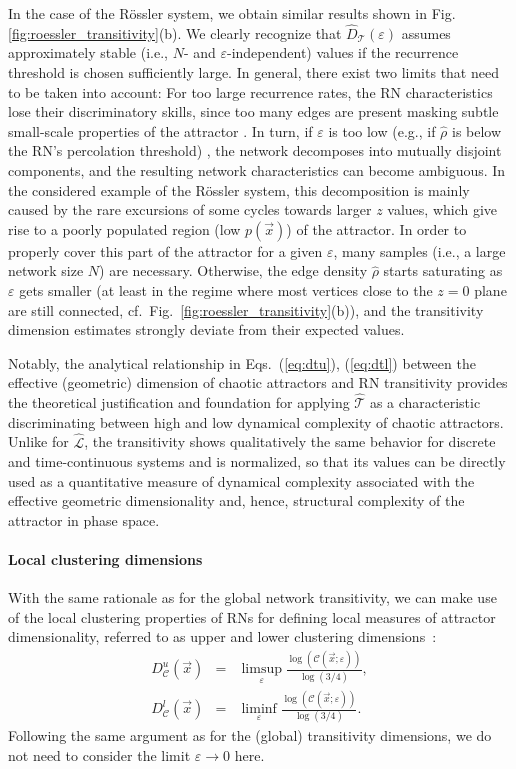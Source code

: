 		In the case of the R\"ossler system, we obtain similar results shown in Fig. \ref{fig:roessler_transitivity}(b).  We clearly recognize that $\hat{D}_{\mathcal{T}}(\varepsilon)$ assumes approximately stable (i.e., $N$- and $\varepsilon$-independent) values if the recurrence threshold is chosen sufficiently large. In general, there exist two limits that need to be taken into account: For too large recurrence rates, the RN characteristics lose their discriminatory skills, since too many edges are present masking subtle small-scale properties of the attractor \cite{Donner2011b,Donner2010b}. In turn, if $\varepsilon$ is too low (e.g., if $\hat{\rho}$ is below the RN's percolation threshold) \cite{Donges2012}, the network decomposes into mutually disjoint components, and the resulting network characteristics can become ambiguous. In the considered example of the R\"ossler system, this decomposition is mainly caused by the rare excursions of some cycles towards larger $z$ values, which give rise to a poorly populated region (low $p(\vec{x})$) of the attractor. In order to properly cover this part of the attractor for a given $\varepsilon$, many samples (i.e., a large network size $N$) are necessary. Otherwise, the edge density $\hat{\rho}$ starts saturating as $\varepsilon$ gets smaller (at least in the regime where most vertices close to the $z=0$ plane are still connected, cf.\, Fig.~\ref{fig:roessler_transitivity}(b)), and the transitivity dimension estimates strongly deviate from their expected values.

		Notably, the analytical relationship in Eqs.~(\ref{eq:dtu}), (\ref{eq:dtl}) between the effective (geometric) dimension of chaotic attractors and RN transitivity provides the theoretical justification and foundation for applying $\hat{\mathcal{T}}$ as a characteristic discriminating between high and low dynamical complexity of chaotic attractors. Unlike for $\hat{\mathcal{L}}$, the transitivity shows qualitatively the same behavior for discrete and time-continuous systems and is normalized, so that its values can be directly used as a quantitative measure of dynamical complexity associated with the effective geometric dimensionality and, hence, structural complexity of the attractor in phase space.


		\paragraph{Local clustering dimensions}\label{sec:transitivitylocal}
		With the same rationale as for the global network transitivity, we can make use of the local clustering properties of RNs for defining local measures of attractor dimensionality, referred to as upper and lower clustering dimensions~\cite{Donner2011b}:
\begin{eqnarray}
D_{\mathcal{C}}^u(\vec{x}) &=& \limsup_{\varepsilon} \frac{\log(\mathcal{C}(\vec{x};\varepsilon))}{\log(3/4)}, \\
D_{\mathcal{C}}^l(\vec{x}) &=& \liminf_{\varepsilon} \frac{\log(\mathcal{C}(\vec{x};\varepsilon))}{\log(3/4)}.
\end{eqnarray}
\noindent
Following the same argument as for the (global) transitivity dimensions, we do not need to consider the limit $\varepsilon\to 0$ here.

